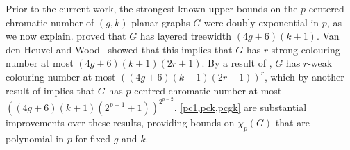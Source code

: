 \documentclass{patmorin}
\begin{document}

Prior to the current work, the strongest known upper bounds on the $p$-centered chromatic number of $(g,k)$-planar graphs $G$ were doubly exponential in $p$, as we now explain. 
\citet{dujmovic.eppstein.ea:structure} proved that $G$ has layered treewidth $(4g+6)(k+1)$. 
Van den Heuvel and Wood~\citep{vdHW17} showed that this implies that $G$  has $r$-strong colouring number at most $(4g + 6)(k + 1)(2r + 1)$. By a result of \citet{zhu:colouring}, $G$ has $r$-weak colouring number at most $( (4g + 6)(k + 1)(2r + 1) )^r$, which by another result of  \citet{zhu:colouring} implies that $G$ has  $p$-centred chromatic number at most $( (4g+6)(k+1)(2^{p-1} + 1) )^{2^{p-2}}$. 
\cref{pc1,pck,pcgk} are substantial improvements over these results, providing bounds on $\chi_p(G)$ that are polynomial in $p$ for fixed $g$ and $k$. 
\end{document}
